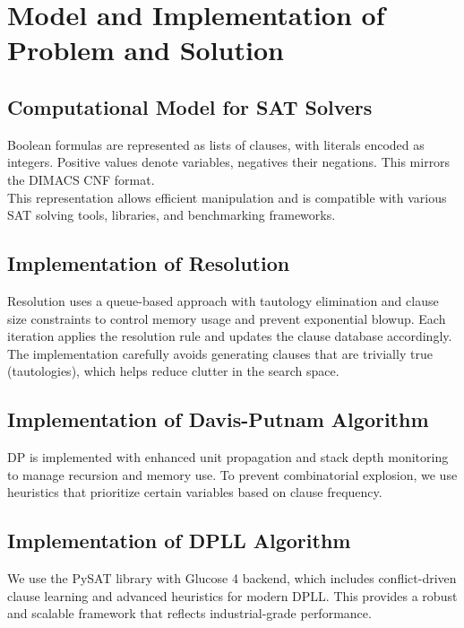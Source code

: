 \documentclass[11pt]{article}
\begin{document}
\section{Model and Implementation of Problem and Solution}

\subsection{Computational Model for SAT Solvers}
\hspace*{2em}
Boolean formulas are represented as lists of clauses, with literals encoded as integers. Positive values denote variables, negatives their negations. This mirrors the DIMACS CNF format.\\
\hspace*{2em}
This representation allows efficient manipulation and is compatible with various SAT solving tools, libraries, and benchmarking frameworks.

\subsection{Implementation of Resolution}
\hspace*{2em}
Resolution uses a queue-based approach with tautology elimination and clause size constraints to control memory usage and prevent exponential blowup. Each iteration applies the resolution rule and updates the clause database accordingly.\\
\hspace*{2em}
The implementation carefully avoids generating clauses that are trivially true (tautologies), which helps reduce clutter in the search space.

\subsection{Implementation of Davis-Putnam Algorithm}
\hspace*{2em}
DP is implemented with enhanced unit propagation and stack depth monitoring to manage recursion and memory use. To prevent combinatorial explosion, we use heuristics that prioritize certain variables based on clause frequency.

\subsection{Implementation of DPLL Algorithm}
\hspace*{2em}
We use the PySAT library with Glucose 4 backend, which includes conflict-driven clause learning and advanced heuristics for modern DPLL. This provides a robust and scalable framework that reflects industrial-grade performance.
\end{document}
